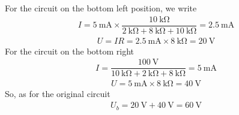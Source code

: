 \documentclass{article}
\begin{document}
For the circuit on the bottom left position, we write
\begin{equation*}
  \begin{aligned}
    I = 5 \  \mathrm{mA} \times \dfrac{10 \  \mathrm{k\Omega}}{2 \  \mathrm{k\Omega} + 8 \  \mathrm{k\Omega} + 10 \  \mathrm{k\Omega}} = 2.5 \  \mathrm{mA}
  \end{aligned}
\end{equation*}
\begin{equation*}
  \begin{aligned}
    U = I R = 2.5 \  \mathrm{mA} \times 8 \  \mathrm{k\Omega} = 20 \  \mathrm{V}
  \end{aligned}
\end{equation*}
For the circuit on the bottom right
\begin{equation*}
  \begin{aligned}
    I = \dfrac{100 \  \mathrm{V}}{10 \  \mathrm{k\Omega} + 2 \  \mathrm{k\Omega} + 8 \  \mathrm{k\Omega}} = 5 \  \mathrm{mA} 
  \end{aligned}
\end{equation*}
\begin{equation*}
  \begin{aligned}
    U = 5 \  \mathrm{mA} \times 8 \  \mathrm{k\Omega} = 40 \  \mathrm{V}
  \end{aligned}
\end{equation*}
So, as for the original circuit
\begin{equation*}
  \begin{aligned}
    U_b = 20 \  \mathrm{V} + 40 \  \mathrm{V} = 60 \  \mathrm{V}
  \end{aligned}
\end{equation*}
\end{document}
